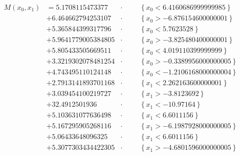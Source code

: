 \documentclass[parskip=half,a4paper]{scrartcl}
\begin{document}
\begin{align*}
    M(x_0,x_1) &= 5.1708115473377 &\cdot&&& \left\{x_0 < 6.4160686999999985\right\} \\
 & +  6.464662794253107 &\cdot&&& \left\{x_0 > -6.876154600000001\right\} \\
 & +  5.365844399317796 &\cdot&&& \left\{x_0 < 5.7623528\right\} \\
 & +  5.9641779005384805 &\cdot&&& \left\{x_0 > -3.825480400000001\right\} \\
 & +  5.805433505669511 &\cdot&&& \left\{x_0 < 4.019110399999999\right\} \\
 & +  3.3219302078481254 &\cdot&&& \left\{x_0 > -0.3389956000000005\right\} \\
 & +  4.743495110124148 &\cdot&&& \left\{x_0 < -1.2106168000000004\right\} \\
 & +  2.7913141893701168 &\cdot&&& \left\{x_1 < 2.262163600000001\right\} \\
 & +  3.039454100219727 &\cdot&&& \left\{x_1 > -3.8123692\right\} \\
 & +  32.4912501936 &\cdot&&& \left\{x_1 < -10.97164\right\} \\
 & +  5.103631077636498 &\cdot&&& \left\{x_1 < 6.6011156\right\} \\
 & +  5.167295905268116 &\cdot&&& \left\{x_1 > -6.1987928000000005\right\} \\
 & +  5.06433648096325 &\cdot&&& \left\{x_1 < 6.6011156\right\} \\
 & +  5.3077303434422305 &\cdot&&& \left\{x_1 > -4.6801596000000005\right\}
\end{align*}
\end{document}
